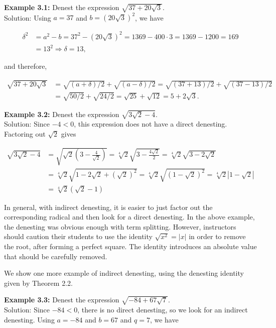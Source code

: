 \documentclass[11pt,letterpaper]{article}
\begin{document}
\noindent\textbf{Example 3.1:} Denest the expression $\sqrt{37+20 \sqrt{3}}$.\\
Solution: Using $a=37$ and $b=(20 \sqrt{3})^{2}$, we have

\[
\begin{aligned}
\delta^{2} & =a^{2}-b=37^{2}-(20 \sqrt{3})^{2}=1369-400 \cdot 3=1369-1200=169 \\
& =13^{2} \Longrightarrow \delta=13,
\end{aligned}
\]

and therefore,

\[
\begin{aligned}
\sqrt{37+20 \sqrt{3}} & =\sqrt{(a+\delta) / 2}+\sqrt{(a-\delta) / 2}=\sqrt{(37+13) / 2}+\sqrt{(37-13) / 2} \\
& =\sqrt{50 / 2}+\sqrt{24 / 2}=\sqrt{25}+\sqrt{12}=5+2\sqrt{3} .
\end{aligned}
\]

\noindent\textbf{Example 3.2:} Denest the expression $\sqrt{3 \sqrt{2}-4}$.\\
Solution: Since $-4<0$, this expression does not have a direct denesting. Factoring out $\sqrt{2}$ gives

\[
\begin{aligned}
\sqrt{3 \sqrt{2}-4} & =\sqrt{\sqrt{2}\left(3-\frac{4}{\sqrt{2}}\right)}=\sqrt[4]{2} \sqrt{3-\frac{4 \sqrt{2}}{2}}=\sqrt[4]{2} \sqrt{3-2 \sqrt{2}} \\
& =\sqrt[4]{2} \sqrt{1-2 \sqrt{2}+(\sqrt{2})^{2}}=\sqrt[4]{2} \sqrt{(1-\sqrt{2})^{2}}=\sqrt[4]{2}|1-\sqrt{2}| \\
& =\sqrt[4]{2}(\sqrt{2}-1)
\end{aligned}
\]

In general, with indirect denesting, it is easier to just factor out the corresponding radical and then look for a direct denesting. In the above example, the denesting was obvious enough with term splitting. However, instructors should caution their students to use the identity $\sqrt{x^{2}}=|x|$ in order to remove the root, after forming a perfect square. The identity introduces an absolute value that should be carefully removed.

We show one more example of indirect denesting, using the denesting identity given by Theorem 2.2.

\noindent\textbf{Example 3.3:} Denest the expression $\sqrt{-84+67 \sqrt{7}}$.\\
Solution: Since $-84<0$, there is no direct denesting, so we look for an indirect denesting. Using $a=-84$ and $b=67$ and $q=7$, we have
\end{document}

